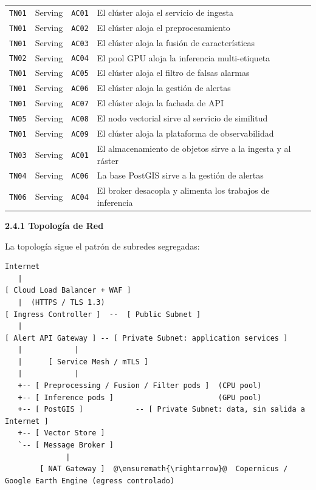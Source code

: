 \documentclass{article}
\newcommand{\mdhfour}[1]{\par\medskip\noindent\textbf{#1}\par\nobreak\smallskip}
\begin{document}
{\begin{longtable}{@{}L{0.45in}L{0.86in}L{0.53in}L{4.11in}@{}}
\texttt{TN01} & Serving & \texttt{AC01} & El clúster aloja el servicio de ingesta \\
\texttt{TN01} & Serving & \texttt{AC02} & El clúster aloja el preprocesamiento \\
\texttt{TN01} & Serving & \texttt{AC03} & El clúster aloja la fusión de características \\
\texttt{TN02} & Serving & \texttt{AC04} & El pool GPU aloja la inferencia multi-etiqueta \\
\texttt{TN01} & Serving & \texttt{AC05} & El clúster aloja el filtro de falsas alarmas \\
\texttt{TN01} & Serving & \texttt{AC06} & El clúster aloja la gestión de alertas \\
\texttt{TN01} & Serving & \texttt{AC07} & El clúster aloja la fachada de API \\
\texttt{TN05} & Serving & \texttt{AC08} & El nodo vectorial sirve al servicio de similitud \\
\texttt{TN01} & Serving & \texttt{AC09} & El clúster aloja la plataforma de observabilidad \\
\texttt{TN03} & Serving & \texttt{AC01} & El almacenamiento de objetos sirve a la ingesta y al ráster \\
\texttt{TN04} & Serving & \texttt{AC06} & La base PostGIS sirve a la gestión de alertas \\
\texttt{TN06} & Serving & \texttt{AC04} & El broker desacopla y alimenta los trabajos de inferencia \\
\end{longtable}
}

\mdhfour{2.4.1 Topología de Red}

La topología sigue el patrón de subredes segregadas:

\begin{lstlisting}
Internet
   |
[ Cloud Load Balancer + WAF ]
   |  (HTTPS / TLS 1.3)
[ Ingress Controller ]  --  [ Public Subnet ]
   |
[ Alert API Gateway ] -- [ Private Subnet: application services ]
   |            |
   |      [ Service Mesh / mTLS ]
   |            |
   +-- [ Preprocessing / Fusion / Filter pods ]  (CPU pool)
   +-- [ Inference pods ]                        (GPU pool)
   +-- [ PostGIS ]            -- [ Private Subnet: data, sin salida a Internet ]
   +-- [ Vector Store ]
   `-- [ Message Broker ]
              |
        [ NAT Gateway ]  @\ensuremath{\rightarrow}@  Copernicus / Google Earth Engine (egress controlado)
\end{lstlisting}
\end{document}
